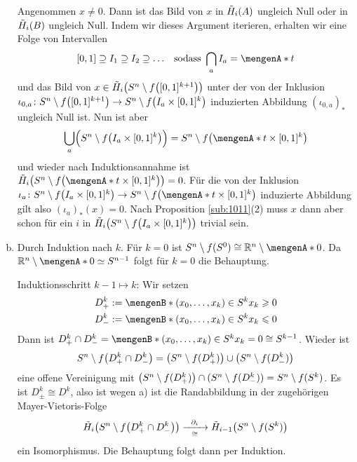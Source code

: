 \begin{enumerate}[a)]
	Angenommen $x \not=0$. Dann ist das Bild von $x$ in $\tilde{H}_i \enbrace*{A}$ ungleich Null oder in $\tilde{H}_i \enbrace*{B}$ ungleich Null. Indem wir dieses Argument 
	iterieren, erhalten wir eine Folge von Intervallen
	\[
		[0,1] \supseteq I_1 \supseteq I_2 \supseteq \ldots \enspace\text{ sodass } \bigcap_a I_a = \set{t} 
	\]
	und das Bild von $x \in \tilde{H}_i \enbrace*{S^n \setminus f \enbrace*{[0,1]^{k+1}}}$ unter der von der Inklusion 
	$\iota_{0,a} \colon S^n \setminus f \enbrace*{[0,1]^{k+1}} \to S^n \setminus f \enbrace*{I_a \times [0,1]^k}$ induzierten Abbildung 
	$(\iota_{0,a})_*$ ungleich Null 
	ist. Nun ist aber 
	\[
		\bigcup_a \enbrace[\Big]{S^n \setminus f \enbrace*{I_a \times [0,1]^k}} = S^n \setminus f \enbrace[\big]{\set{t} \times [0,1]^k }  
	\]
	und wieder nach Induktionsannahme ist $\tilde{H}_i \enbrace*{S^n \setminus f \enbrace*{\set{t} \times [0,1]^k}} =0$.  Für die von der Inklusion
	$\iota_a \colon S^n \setminus f \enbrace*{I_a \times [0,1]^k}  \to S^n \setminus f \enbrace*{\set{t} \times [0,1]^k}$ induzierte Abbildung gilt also
	$(\iota_a)_*(x)=0$. Nach Proposition \ref{sub:1011}(2) muss $x$ dann aber schon für ein $i$ in $\tilde{H}_i \enbrace*{S^n \setminus f \enbrace*{I_a \times [0,1]^k} }$ 
	trivial sein. \light
	\item Durch Induktion nach $k$. Für $k=0$ ist $S^n \setminus f(S^0) \cong \mathds{R}^n \setminus \set{0}$. Da $\mathds{R}^n \setminus \set{0} \simeq S^{n-1}$
	folgt für $k=0$ die Behauptung.
	
	Induktionsschritt $k-1 \mapsto k$: Wir setzen 
	\begin{align*}
		D^k_+ &:= \set[(x_0,\ldots ,x_k) \in S^k]{x_k \ge 0} \\
		D^k_- &:= \set[(x_0, \ldots , x_k) \in S^k]{x_k \le 0}
	\end{align*}
	Dann ist 
	$D^k_+ \cap D^k_- = \set[(x_0, \ldots ,x_k)\in S^k]{x_k=0} \cong S^{k-1}$. Wieder ist 
	\[
		S^n \setminus f \enbrace*{D^k_+ \cap D^k_-} =\enbrace*{S^n \setminus f(D^k_+)} \cup \enbrace*{S^n \setminus f(D^k_-)}  
	\]
	eine offene Vereinigung mit $\enbrace*{S^n \setminus f(D^k_+)} \cap (S^n \setminus f(D^k_-)) = S^n \setminus f(S^k)$. Es ist $D^k_{\pm} \cong D^{k}$, also ist
	wegen a) ist die Randabbildung in der zugehörigen Mayer-Vietoris-Folge
	\[
		\tilde{H}_i \enbrace*{S^n \setminus f \enbrace*{D^k_+ \cap D^k_-} } \xrightarrow[\cong]{\minwidthbox{\partial_i}{2em}} \tilde{H}_{i-1} \enbrace*{S^n \setminus f(S^k)}   
	\]
	ein Isomorphismus. Die Behauptung folgt dann per Induktion. \bewende
\end{enumerate}
\newpage


